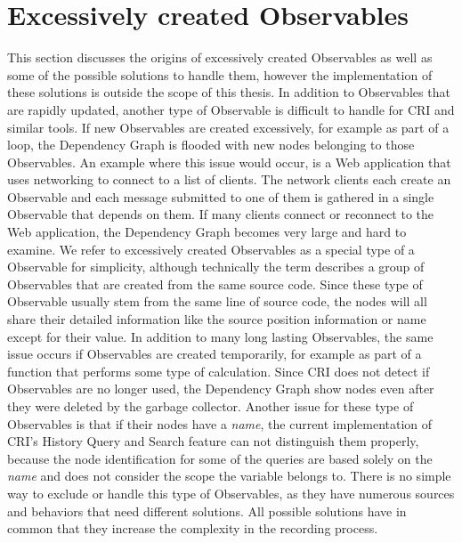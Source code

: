 \section{Excessively created Observables}
\label{sec:DynamicallyCreated}
This section discusses the origins of excessively created Observables as well as some of the possible solutions to handle them, however the implementation of these solutions is outside the scope of this thesis.
In addition to Observables that are rapidly updated, another type of Observable is difficult to handle for CRI and similar tools. If new Observables are created excessively, for example as part of a loop, the Dependency Graph is flooded with new nodes belonging to those Observables. An example where this issue would occur, is a Web application that uses networking to connect to a list of clients. The network clients each create an Observable and each message submitted to one of them is gathered in a single Observable that depends on them. If many clients connect or reconnect to the Web application, the Dependency Graph becomes very large and hard to examine. We refer to excessively created Observables as a special type of a Observable for simplicity, although technically the term describes a group of Observables that are created from the same source code. Since these type of Observable usually stem from the same line of source code, the nodes will all share their detailed information like the source position information or name except for their value. In addition to many long lasting Observables, the same issue occurs if Observables are created temporarily, for example as part of a function that performs some type of calculation. Since CRI does not detect if Observables are no longer used, the Dependency Graph show nodes even after they were deleted by the garbage collector. Another issue for these type of Observables is that if their nodes have a \emph{name}, the current implementation of CRI's History Query and Search feature can not distinguish them properly, because the node identification for some of the queries are based solely on the \emph{name} and does not consider the scope the variable belongs to.
There is no simple way to exclude or handle this type of Observables, as they have numerous sources and behaviors that need different solutions. All possible solutions have in common that they increase the complexity in the recording process.

